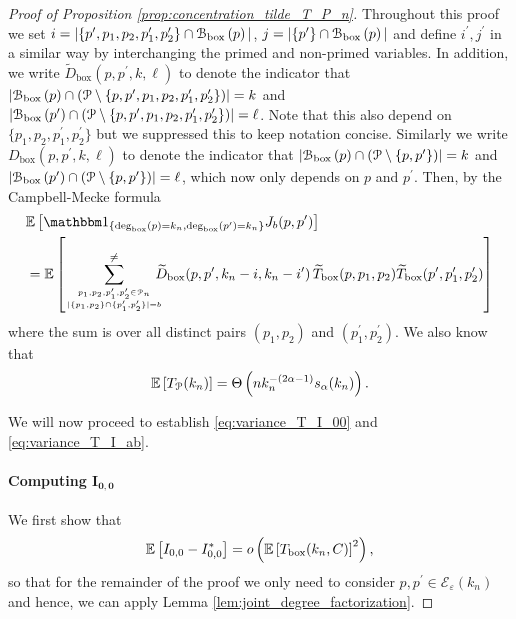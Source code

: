 \begin{proof}[Proof of Proposition \ref{prop:concentration_tilde_T_P_n}]

Throughout this proof we set $i = |\{p^\prime, p_1, p_2, p_1^\prime, p_2^\prime\} \cap {\mathcal B}_{\text{box}}\left(p\right)|$, $j = |\{p^\prime\} \cap {\mathcal B}_{\text{box}}\left(p\right)|$ and define $i^\prime, j^\prime$ in a similar way by interchanging the primed and non-primed variables. In addition, we write $\widetilde{D}_{\text{box}}(p,p^\prime,k,\ell)$ to denote the indicator that $|{\mathcal B}_{\text{box}}\left(p\right) \cap ({\mathcal P} \setminus \{p, p^\prime, p_1, p_2, p_1^\prime, p_2^\prime\})| = k$ and $|{\mathcal B}_{\text{box}}\left(p^\prime\right) \cap ({\mathcal P} \setminus \{p, p^\prime, p_1, p_2, p_1^\prime, p_2^\prime\})| = \ell$. Note that this also depend on $\{p_1, p_2, p_1^\prime, p_2^\prime\}$ but we suppressed this to keep notation concise. Similarly we write $D_{\text{box}}(p,p^\prime,k,\ell)$ to denote the indicator that $|{\mathcal B}_{\text{box}}\left(p\right) \cap ({\mathcal P} \setminus \{p, p^\prime\})| = k$ and $|{\mathcal B}_{\text{box}}\left(p^\prime\right) \cap ({\mathcal P} \setminus \{p, p^\prime\})| = \ell$, which now only depends on $p$ and $p^\prime$. Then, by the Campbell-Mecke formula
\begin{align*}
	&\Exp{\ind{\Dbox(p) = k_n, \Dbox(p^\prime) = k_n} J_b(p,p^\prime)}\\
	&= \Exp{\sum_{p_1, p_2, p_1^\prime, p_2^\prime \in \Pcal_n 
		\atop |\{p_1, p_2\} \cap \{p_1^\prime, p_2^\prime\}| = b}^{\ne}
			\hspace{-7pt} \widetilde{D}_{\text{box}}(p,p^\prime, k_n-i,k_n- i^\prime) \,
			\widetilde{T}_{\text{box}}(p,p_1,p_2) \widetilde{T}_{\text{box}}(p^\prime, p_1^\prime, p_2^\prime)}
\end{align*}
where the sum is over all distinct pairs $(p_1, p_2)$ and $(p_1^\prime, p_2^\prime)$. We also know that 
\[
	\mathbb{E}\left[T_{{\mathcal P}}(k_n)\right] = \Theta\left(n k_n^{-(2\alpha - 1)} s_\alpha(k_n)\right).
\]

We will now proceed to establish \eqref{eq:variance_T_I_00} and \eqref{eq:variance_T_I_ab}. 

\paragraph{Computing $\bm{I_{0,0}}$}
We first show that
\begin{equation}\label{eq:I_ab_ast_main}
	\mathbb{E}\left[I_{0,0} - I_{0,0}^\ast\right] = o\left(\mathbb{E}\left[T_{\text{box}}(k_n,C)\right]^2\right),
\end{equation}
so that for the remainder of the proof we only need to consider $p, p^\prime \in \mathcal{E}_\varepsilon(k_n)$ and hence, we can apply Lemma \ref{lem:joint_degree_factorization}. 


\end{proof}
